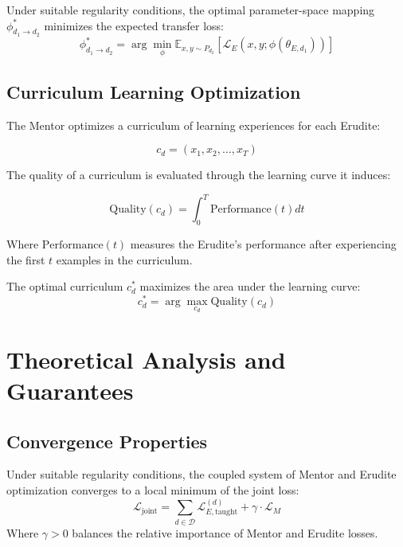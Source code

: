 \begin{theorem}
Under suitable regularity conditions, the optimal parameter-space mapping $\phi_{d_1 \rightarrow d_2}^*$ minimizes the expected transfer loss:
\begin{equation}
\phi_{d_1 \rightarrow d_2}^* = \arg\min_{\phi} \mathbb{E}_{x,y \sim P_{d_2}} [\mathcal{L}_E(x, y; \phi(\theta_{E,d_1}))]
\end{equation}
\end{theorem}

\subsection{Curriculum Learning Optimization}

The Mentor optimizes a curriculum of learning experiences for each Erudite:

\begin{equation}
c_d = (x_1, x_2, \ldots, x_T)
\end{equation}

The quality of a curriculum is evaluated through the learning curve it induces:

\begin{equation}
\text{Quality}(c_d) = \int_{0}^{T} \text{Performance}(t) dt
\end{equation}

Where $\text{Performance}(t)$ measures the Erudite's performance after experiencing the first $t$ examples in the curriculum.

\begin{theorem}
The optimal curriculum $c_d^*$ maximizes the area under the learning curve:
\begin{equation}
c_d^* = \arg\max_{c_d} \text{Quality}(c_d)
\end{equation}
\end{theorem}

\section{Theoretical Analysis and Guarantees}

\subsection{Convergence Properties}

\begin{theorem}
Under suitable regularity conditions, the coupled system of Mentor and Erudite optimization converges to a local minimum of the joint loss:
\begin{equation}
\mathcal{L}_{\text{joint}} = \sum_{d \in \mathcal{D}} \mathcal{L}_{E,\text{taught}}^{(d)} + \gamma \cdot \mathcal{L}_M
\end{equation}
Where $\gamma > 0$ balances the relative importance of Mentor and Erudite losses.
\end{theorem}

